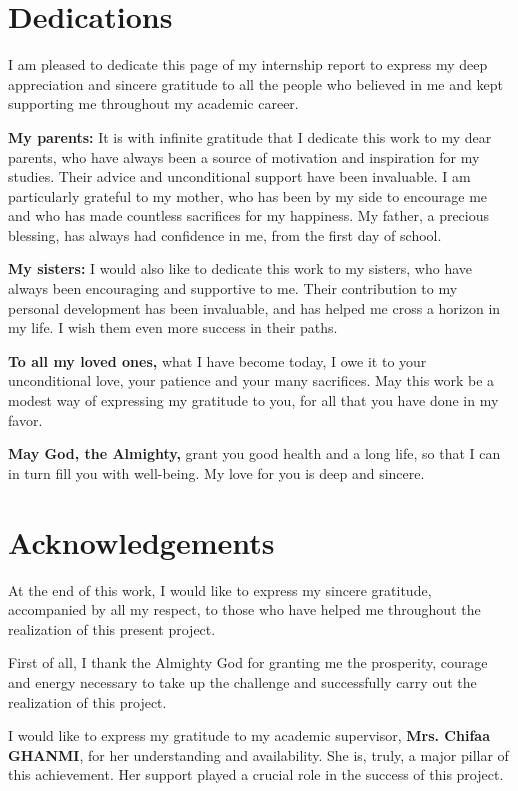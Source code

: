 \chapter*{Dedications}
\hspace{1cm} I am pleased to dedicate this page of my internship report to express my deep appreciation and sincere gratitude to all the people who believed in me and kept supporting me throughout my academic career.\bigskip

\textbf{My parents:} It is with infinite gratitude that I dedicate this work to my dear parents, who have always been a source of motivation and inspiration for my studies. Their advice and unconditional support have been invaluable.
I am particularly grateful to my mother, who has been by my side to encourage me and who has made countless sacrifices for my happiness. My father, a precious blessing, has always had confidence in me, from the first day of school.\bigskip

\textbf{My sisters:} I would also like to dedicate this work to my sisters, who have always been encouraging and supportive to me. Their contribution to my personal development has been invaluable, and has helped me cross a horizon in my life. I wish them even more success in their paths.\bigskip

\textbf{To all my loved ones,} what I have become today, I owe it to your unconditional love, your patience and your many sacrifices.
May this work be a modest way of expressing my gratitude to you, for all that you have done in my favor.\bigskip

\textbf{May God, the Almighty,} grant you good health and a long life, so that I can in turn fill you with well-being. My love for you is deep and sincere.

\chapter*{Acknowledgements}
\hspace{1cm} At the end of this work, I would like to express my sincere gratitude, accompanied by all my respect, to those who have helped me throughout the realization of this present project.\bigskip

First of all, I thank the Almighty God for granting me the prosperity, courage and energy necessary to take up the challenge and successfully carry out the realization of this project.\bigskip

I would like to express my gratitude to my academic supervisor, \textbf{Mrs. Chifaa GHANMI}, for her understanding and availability. She is, truly, a major pillar of this achievement. Her support played a crucial role in the success of this project.\bigskip

